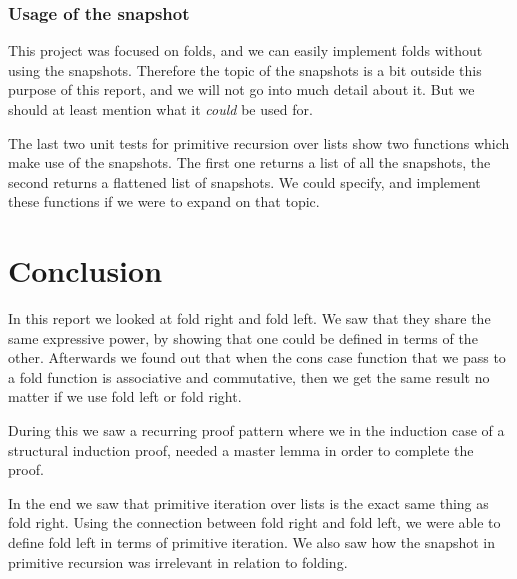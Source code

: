 \documentclass[a4paper]{article}
\begin{document}
\subsubsection{Usage of the snapshot}
This project was focused on folds, and we can easily implement folds without
using the snapshots. Therefore the topic of the snapshots is a bit outside this
purpose of this report, and we will not go into much detail about it. But we
should at least mention what it \emph{could} be used for.

The last two unit tests for primitive recursion over lists show two functions
which make use of the snapshots. The first one returns a list of all the
snapshots, the second returns a flattened list of snapshots. We could specify,
and implement these functions if we were to expand on that topic.

\section{Conclusion}
In this report we looked at fold right and fold left. We saw that they share the
same expressive power, by showing that one could be defined in terms of the 
other. Afterwards we found out that when the cons case function that we pass
to a fold function is associative and commutative, then we get the same result
no matter if we use fold left or fold right. 

During this we saw a recurring proof pattern where we in the induction case of a
structural induction proof, needed a master lemma in order to complete the
proof.

In the end we saw that primitive iteration over lists is the exact same
thing as fold right. Using the connection between fold right and fold left, we
were able to define fold left in terms of primitive iteration. We also saw how
the snapshot in primitive recursion was irrelevant in relation to folding.
\end{document}
